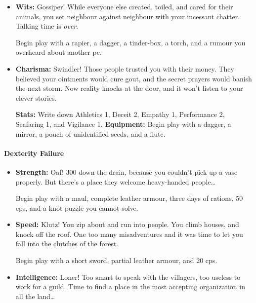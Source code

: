 {\begin{multicols}{2}
\begin{itemize}
  \textbf{Stats:}
  Write down Academics 2, Performance 1, Vigilance 1, and the Rituals Knack.
  Then fill in Earth 1, Fire 1.

  \textbf{Equipment:}
  Begin play with a piece of chalk, a tinder-box, a mirror, 50' of rope, writing equipment, and four letters you wrote (still undelivered).
  \item
  \textbf{Wits:}
  Gossiper!
  While everyone else created, toiled, and cared for their animals, you set neighbour against neighbour with your incessant chatter.
  Talking time is \emph{over}.

  Begin play with a rapier, a dagger, a tinder-box, a torch, and a rumour you overheard about another \gls{pc}.
  \item
  \textbf{Charisma:}
  Swindler!
  Those people trusted you with their money.
  They believed your ointments would cure gout, and the secret prayers would banish the next storm.
  Now reality knocks at the door, and it won't listen to your clever stories.

  \textbf{Stats:}
  Write down Athletics 1, Deceit 2, Empathy 1, Performance 2, Seafaring 1, and Vigilance 1.
  \textbf{Equipment:}
  Begin play with a dagger, a mirror, a pouch of unidentified seeds, and a flute.

\end{itemize}

\paragraph{Dexterity Failure}

\begin{itemize}

  \item
  \textbf{Strength:}
  Oaf!
  300  down the drain, because you couldn't pick up a vase properly.
  But there's a place they welcome heavy-handed people\ldots

  Begin play with a maul, complete leather armour, three days of rations, 50 \glspl{cp}, and a knot-puzzle you cannot solve.

  \item
  \textbf{Speed:}
  Klutz!
  You zip about and run into people.
  You climb houses, and knock off the roof.
  One too many misadventures and it was time to let you fall into the clutches of the forest.

  Begin play with a short sword, partial leather armour, and 20 \glspl{cp}.
  \item
  \textbf{Intelligence:}
  Loner!
  Too smart to speak with the villagers, too useless to work for a guild.
  Time to find a place in the most accepting organization in all the land\ldots


\end{itemize}
\end{multicols}}

